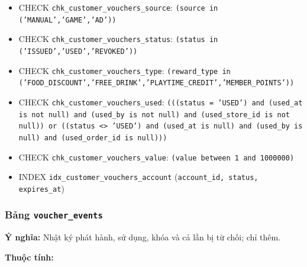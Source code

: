 \begin{itemize}
\item CHECK \texttt{chk\_customer\_vouchers\_source}: \texttt{(source in ('MANUAL','GAME','AD'))}

\item CHECK \texttt{chk\_customer\_vouchers\_status}: \texttt{(status in ('ISSUED','USED','REVOKED'))}

\item CHECK \texttt{chk\_customer\_vouchers\_type}: \texttt{(reward\_type in ('FOOD\_DISCOUNT','FREE\_DRINK','PLAYTIME\_CREDIT','MEMBER\_POINTS'))}

\item CHECK \texttt{chk\_customer\_vouchers\_used}: \texttt{(((status = 'USED') and (used\_at is not null) and (used\_by is not null) and (used\_store\_id is not null)) or ((status <> 'USED') and (used\_at is null) and (used\_by is null) and (used\_order\_id is null)))}

\item CHECK \texttt{chk\_customer\_vouchers\_value}: \texttt{(value between 1 and 1000000)}

\item INDEX \texttt{idx\_customer\_vouchers\_account} (\texttt{account\_id, status, expires\_at})

\end{itemize}

\subsubsection{Bảng \texttt{voucher\_events}}

\textbf{Ý nghĩa:} Nhật ký phát hành, sử dụng, khóa và cả lần bị từ chối; chỉ thêm.\par

\textbf{Thuộc tính:}

